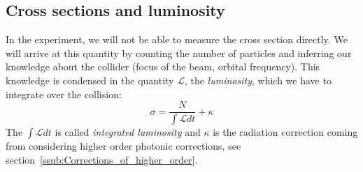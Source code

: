 \subsection{Cross sections and luminosity}
In the experiment, we will not be able to measure the cross section directly. We will arrive at this quantity by
counting the number of particles and inferring our knowledge about the collider (focus of the beam, orbital frequency). This
knowledge is condensed in the quantity $\mathcal{L}$, the \textit{luminosity}, which we have to integrate over the collision:
\begin{equation}
    \sigma = \frac{N}{\int \mathcal{L} dt} + \kappa
\end{equation}
The $\int \mathcal{L} dt$ is called \textit{integrated luminosity} and $\kappa$ is the radiation correction coming from 
considering higher order photonic corrections, see section~\ref{ssub:Corrections_of_higher_order}.
